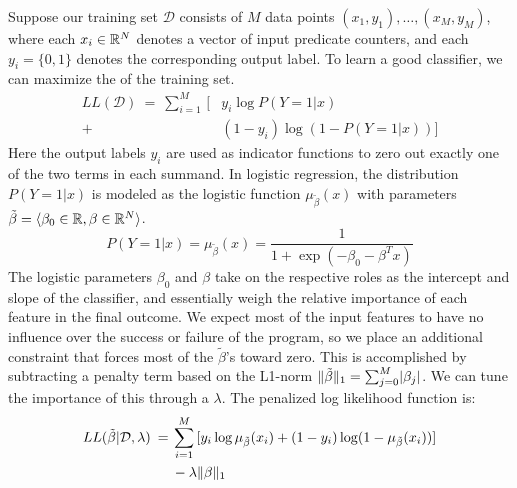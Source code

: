 Suppose our training set $\mathcal{D}$ consists of $M$ data points
$(x_1,y_1), \ldots, (x_M, y_M) $, where each $x_i \in \mathbb{R}^N$ denotes
a vector of input predicate counters, and each $y_i = \{0, 1\}$
denotes the corresponding output label.  To learn a good classifier,
we can maximize the  of the training set.
\begin{equation*}
  \begin{split}
    LL(\mathcal{D}) \:=\:
    \sum_{i=1}^M \, [ & y_i \log P(Y = 1 | x) \\
    + & (1 - y_i) \log (1 - P(Y = 1 | x)) ]
  \end{split}
\end{equation*}
Here the output labels $y_i$ are used as indicator functions to zero
out exactly one of the two terms in each summand.  In logistic
regression, the distribution $P(Y=1|x)$ is modeled as the logistic
function $\mu_{\tilde{\beta}}(x)$ with parameters $\tilde{\beta} = \langle \beta_0 \in
\mathbb{R}, \beta \in \mathbb{R}^N \rangle$.
\begin{equation*}
  P(Y = 1 | x) = \mu_{\tilde{\beta}} (x) = \frac{1}{1 + \exp(- \beta_0 - \beta^T x)}
\end{equation*}
The logistic parameters $\beta_0$ and $\beta$ take on the respective roles as
the intercept and slope of the classifier, and essentially weigh the
relative importance of each feature in the final outcome.  We expect
most of the input features to have no influence over the success or
failure of the program, so we place an additional constraint that
forces most of the $\tilde{\beta}$'s toward zero.  This is accomplished by
subtracting a penalty term based on the L1-norm $\lVert\tilde{\beta}\rVert_1 =
\sum_{j=0}^M \lvert\beta_j\rvert$.  We can tune the importance of this
 through a  $\lambda$.  The penalized log likelihood function is:
\begin{equation*}
  \begin{split}
    LL (\tilde{\beta} | \mathcal{D}, \lambda ) \:=\:
    & \sum_{i=1}^M \, [y_i \log \mu_{\tilde{\beta}} (x_i) + (1 - y_i) \log (1 - \mu_{\tilde{\beta}} (x_i))] \\
    & - \lambda \lVert\beta\rVert_1
  \end{split}
\end{equation*}

